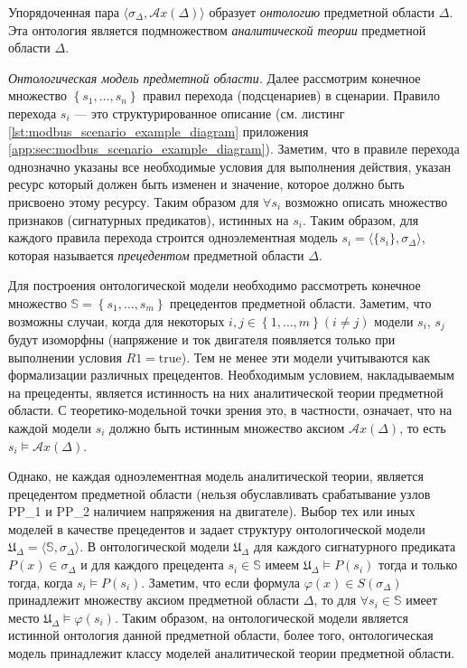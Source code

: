 Упорядоченная пара $\langle\sigma_\Delta, \mathcal{A}x(\Delta)\rangle$ образует \textit{онтологию} предметной области $\Delta$.
Эта онтология является подмножеством \textit{аналитической теории} предметной области $\Delta$.


\textit{Онтологическая модель предметной области.}
Далее рассмотрим конечное множество $\left\{ s_1, \ldots, s_n \right\}$ правил перехода (подсценариев) в сценарии.
Правило перехода $s_i$ --- это структурированное описание (см. листинг \ref{lst:modbus_scenario_example_diagram} приложения \ref{app:sec:modbus_scenario_example_diagram}).
Заметим, что в правиле перехода однозначно указаны все необходимые условия для выполнения действия,
указан ресурс который должен быть изменен и значение, которое должно быть присвоено этому ресурсу.
Таким образом для $\forall s_i$ возможно описать множество признаков (сигнатурных предикатов), истинных на $s_i$.
Таким образом, для каждого правила перехода строится одноэлементная модель $s_i = \langle \{s_i\}, \sigma_\Delta \rangle$,
которая называется \textit{прецедентом} предметной области $\Delta$.

Для построения онтологической модели необходимо рассмотреть конечное множество 
$\mathbb{S}=\left\{ s_1, \ldots, s_m \right\}$ прецедентов предметной области.
Заметим, что возможны случаи, когда для некоторых $i,j \in \left\{1,\ldots,m\right\} (i\ne j)$
модели $s_i$, $s_j$ будут изоморфны (напряжение и ток двигателя появляется только при выполнении условия $R1 = \mbox{true}$).
Тем не менее эти модели учитываются как формализации различных прецедентов.
Необходимым условием, накладываемым на прецеденты, является истинность на них аналитической теории предметной области.
С теоретико-модельной точки зрения это, в частности, означает, что на каждой модели $s_i$ должно быть истинным множество аксиом
$\mathcal{A}x(\Delta)$, то есть $s_i \vDash \mathcal{A}x(\Delta)$.

Однако, не каждая одноэлементная модель аналитической теории, является прецедентом предметной
области (нельзя обуславливать срабатывание узлов PP\_1 и PP\_2 наличием напряжения на двигателе).
Выбор тех или иных моделей в качестве прецедентов и задает структуру онтологической модели
$\mathfrak{U}_\Delta =\langle \mathbb{S}, \sigma_\Delta \rangle$.
В онтологической модели $\mathfrak{U}_\Delta$ для каждого сигнатурного предиката $P(x) \in \sigma_\Delta$
и для каждого прецедента $s_i \in \mathbb{S}$ имеем $\mathfrak{U}_\Delta \vDash P(s_i)$
тогда и только тогда, когда $s_i \vDash P(s_i)$.
Заметим, что если формула $\varphi(x) \in S(\sigma_\Delta)$ принадлежит множеству аксиом предметной
области $\Delta$, то для $\forall s_i \in \mathbb{S}$  имеет место $\mathfrak{U}_\Delta \vDash\varphi(s_i)$.
Таким образом, на онтологической модели является истинной онтология данной предметной области,
более того, онтологическая модель принадлежит классу моделей аналитической теории предметной области.

